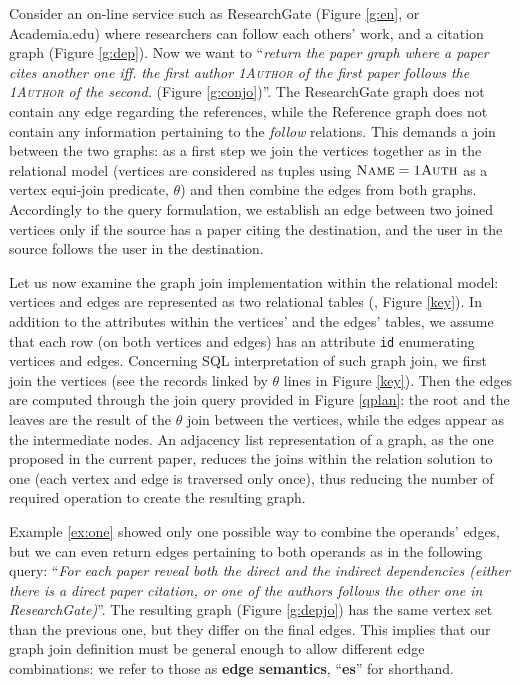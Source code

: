 \begin{example}\label{ex:one}
	Consider an on-line service such as \textup{ResearchGate} (Figure \ref{g:en}, or Academia.edu)
	where researchers can \textup{follow} each others' work, and a \textup{citation} graph (Figure \ref{g:dep}). Now
	we want to
	``\textit{return the paper graph where a paper cites another one iff.\,\,the \textup{first
			author} \textsc{1Author} of the first paper \textup{follows} the \textsc{1Author} of the second.} (Figure \ref{g:conjo})''. The
	\textup{ResearchGate} graph does not contain any edge regarding the \textup{references}, while the
	\textup{Reference} graph does not contain any information pertaining to the \textit{follow} relations.
	This demands a join between the two graphs: as a first step we
	join the vertices together as in the relational model (vertices are considered
	as tuples using $\textsc{Name}=\textsc{1Auth}$ as a vertex equi-join predicate, $\theta$) and then combine the
	edges from both graphs. Accordingly
	to the query formulation, we establish an edge between two joined vertices
	only if the source has a paper citing the destination, and the
	user in the source follows the user in the destination.
\end{example}
Let us now examine the graph join implementation within the relational model:
vertices and edges are represented as two relational tables (\cite{SQLGraph}, Figure \ref{key}).
In addition to the attributes within the vertices' and the edges' tables,
we assume that each row (on both vertices and edges) has an attribute \texttt{id}
enumerating vertices and edges. Concerning SQL interpretation of such graph join,
we first join the vertices (see the records linked by $\theta$ lines in Figure \ref{key}).
Then the
edges are computed through the join query provided in Figure \ref{qplan}:
the root and the leaves are the result of the $\theta$ join between the vertices,
while the edges appear as the
intermediate nodes. An adjacency list representation of a graph, as the one
proposed in the current paper, reduces the joins within the relation
solution to one (each vertex and edge is traversed only once),
thus reducing the number of required operation to create the resulting
graph.

Example \ref{ex:one} showed only
one possible way to combine the operands' edges, but
we can even return
edges pertaining to both operands as in the following query:
``\textit{For each paper reveal both the direct
	and the indirect dependencies (either there is a direct paper citation,
	or one of the authors follows the other one in ResearchGate)}''.
The resulting graph  (Figure \ref{g:depjo}) has the same vertex set than the previous one, but
they differ on the final edges.
This implies that our graph join definition must be general enough to
allow different edge combinations: we refer to those as
\textbf{edge semantics}, ``\textbf{es}'' for shorthand.

